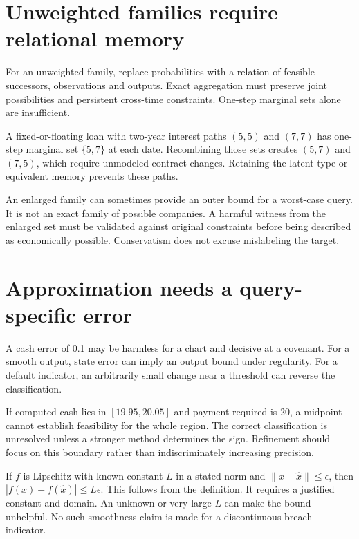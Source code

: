 



\section{Unweighted families require relational memory}
For an unweighted family, replace probabilities with a relation of feasible successors, observations and outputs. Exact aggregation must preserve joint possibilities and persistent cross-time constraints. One-step marginal sets alone are insufficient.

A fixed-or-floating loan with two-year interest paths $(5,5)$ and $(7,7)$ has one-step marginal set $\{5,7\}$ at each date. Recombining those sets creates $(5,7)$ and $(7,5)$, which require unmodeled contract changes. Retaining the latent type or equivalent memory prevents these paths.

An enlarged family can sometimes provide an outer bound for a worst-case query. It is not an exact family of possible companies. A harmful witness from the enlarged set must be validated against original constraints before being described as economically possible. Conservatism does not excuse mislabeling the target.

\section{Approximation needs a query-specific error}
A cash error of 0.1 may be harmless for a chart and decisive at a covenant. For a smooth output, state error can imply an output bound under regularity. For a default indicator, an arbitrarily small change near a threshold can reverse the classification.

If computed cash lies in $[19.95,20.05]$ and payment required is 20, a midpoint cannot establish feasibility for the whole region. The correct classification is unresolved unless a stronger method determines the sign. Refinement should focus on this boundary rather than indiscriminately increasing precision.

If $f$ is Lipschitz with known constant $L$ in a stated norm and $\|x-\hat x\|\leq\epsilon$, then $|f(x)-f(\hat x)|\leq L\epsilon$. This follows from the definition. It requires a justified constant and domain. An unknown or very large $L$ can make the bound unhelpful. No such smoothness claim is made for a discontinuous breach indicator.

